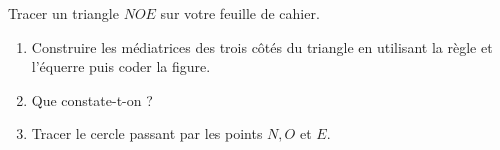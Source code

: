 \begin{exercice*}
   Tracer un triangle $NOE$ sur votre feuille de cahier.
   \begin{enumerate}
      \item Construire les médiatrices des trois côtés du triangle en utilisant la règle et l'équerre puis coder la figure.
      \item Que constate-t-on ?
      \item Tracer le cercle passant par les points $N, O$ et $E$.
   \end{enumerate}
\end{exercice*}

